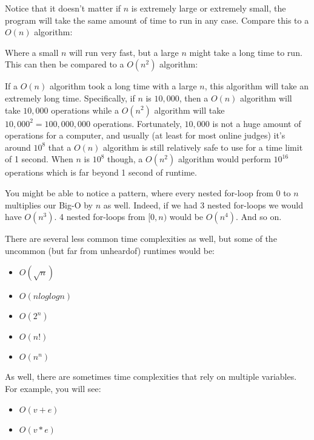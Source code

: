 
Notice that it doesn't matter if $n$ is extremely large or extremely small, the program will take the same amount of time to run in any case. Compare this to a $O(n)$ algorithm:


Where a small $n$ will run very fast, but a large $n$ might take a long time to run. This can then be compared to a $O(n^2)$ algorithm:


If a $O(n)$ algorithm took a long time with a large $n$, this algorithm will take an extremely long time. Specifically, if $n$ is $10,000$, then a $O(n)$ algorithm will take $10,000$ operations while a $O(n^2)$ algorithm will take $10,000^2 = 100,000,000$ operations. Fortunately, $10,000$ is not a huge amount of operations for a computer, and usually (at least for most online judges) it's around $10^8$ that a $O(n)$ algorithm is still relatively safe to use for a time limit of 1 second. When $n$ is $10^8$ though, a $O(n^2)$ algorithm would perform $10^{16}$ operations which is far beyond 1 second of runtime.

You might be able to notice a pattern, where every nested for-loop from $0$ to $n$ multiplies our Big-O by $n$ as well. Indeed, if we had 3 nested for-loops we would have $O(n^3)$. 4 nested for-loops from $[0,n)$ would be $O(n^4)$. And so on.

There are several less common time complexities as well, but some of the uncommon (but far from unheardof) runtimes would be:

\begin{itemize}
\item $O(\sqrt{n})$
\item $O(n log log n)$
\item $O(2^n)$
\item $O(n!)$
\item $O(n^n)$
\end{itemize}

As well, there are sometimes time complexities that rely on multiple variables. For example, you will see:

\begin{itemize}
\item $O(v + e)$
\item $O(v * e)$
\end{itemize}

